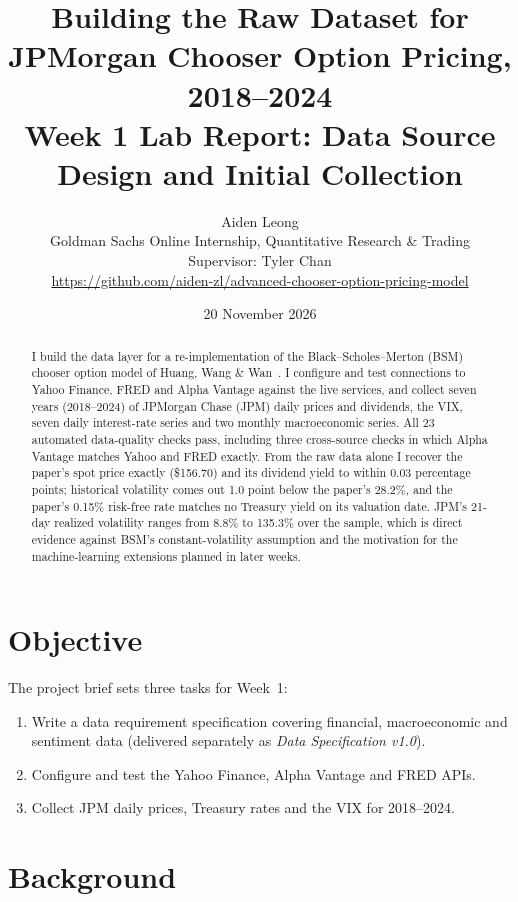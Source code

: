 \documentclass[11pt]{article}
\title{\textbf{Building the Raw Dataset for JPMorgan Chooser Option Pricing, 2018--2024}\\[4pt]
\large Week 1 Lab Report: Data Source Design and Initial Collection}
\author{Aiden Leong\\[2pt]
\small Goldman Sachs Online Internship, Quantitative Research \& Trading\\
\small Supervisor: Tyler Chan\\
\small \url{https://github.com/aiden-zl/advanced-chooser-option-pricing-model}}
\date{20 November 2026}
\begin{document}
\maketitle

\begin{abstract}
\noindent
I build the data layer for a re-implementation of the Black--Scholes--Merton (BSM) chooser option model of
Huang, Wang \& Wan~\cite{huang2021}. I configure and test connections to Yahoo Finance, FRED and Alpha Vantage against the live
services, and collect seven years (2018--2024) of JPMorgan Chase (JPM) daily prices and dividends, the VIX,
seven daily interest-rate series and two monthly macroeconomic series. All 23 automated data-quality
checks pass, including three cross-source checks in which Alpha Vantage matches Yahoo and FRED exactly. From the raw
data alone I recover the paper's spot price exactly (\$156.70) and its dividend yield to within 0.03 percentage
points; historical volatility comes out 1.0 point below the paper's 28.2\%, and the paper's 0.15\% risk-free rate
matches no Treasury yield on its valuation date. JPM's 21-day realized volatility ranges from 8.8\% to 135.3\%
over the sample, which is direct evidence against BSM's constant-volatility assumption and the motivation for the
machine-learning extensions planned in later weeks.
\end{abstract}

\section{Objective}
The project brief sets three tasks for Week~1:
\begin{enumerate}
  \item Write a data requirement specification covering financial, macroeconomic and sentiment data
        (delivered separately as \emph{Data Specification v1.0}).
  \item Configure and test the Yahoo Finance, Alpha Vantage and FRED APIs.
  \item Collect JPM daily prices, Treasury rates and the VIX for 2018--2024.
\end{enumerate}

\section{Background}
\end{document}
